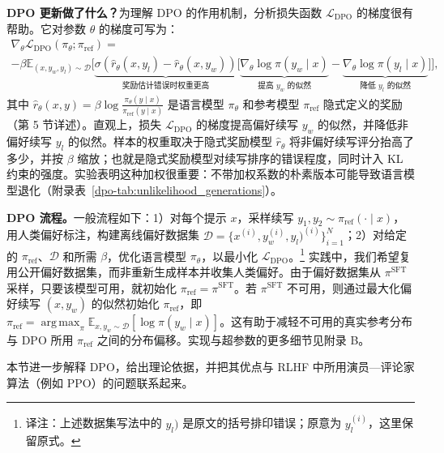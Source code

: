\textbf{DPO 更新做了什么？}为理解 DPO 的作用机制，分析损失函数 $\mathcal L_\text{DPO}$ 的梯度很有帮助。它对参数 $\theta$ 的梯度可写为：
\label{dpo-eq:gradient}
\begin{multline*}
    \nabla_\theta \mathcal{L}_\text{DPO}(\pi_\theta;\pi_{\mathrm{ref}}) = \\ -\beta\mathbb{E}_{(x, y_w, y_l) \sim \mathcal{D}} \bigg[\underbrace{\sigma(\hat{r}_\theta(x, y_l) - \hat{r}_\theta (x, y_w))}_\text{奖励估计错误时权重更高}\bigg[\underbrace{\nabla_\theta\log \pi(y_w \mid x)}_\text{提高 $y_w$ 的似然} - \underbrace{\nabla_\theta\log\pi(y_l \mid x)}_\text{降低 $y_l$ 的似然}\bigg]\bigg],
\end{multline*}
其中 $\hat r_\theta(x,y)=\beta\log\frac{\pi_\theta(y\mid x)}{\pi_{\mathrm{ref}}(y\mid x)}$ 是语言模型 $\pi_\theta$ 和参考模型 $\pi_{\mathrm{ref}}$ 隐式定义的奖励（第 5 节详述）。直观上，损失 $\mathcal L_\text{DPO}$ 的梯度提高偏好续写 $y_w$ 的似然，并降低非偏好续写 $y_l$ 的似然。样本的权重取决于隐式奖励模型 $\hat r_\theta$ 将非偏好续写评分抬高了多少，并按 $\beta$ 缩放；也就是隐式奖励模型对续写排序的错误程度，同时计入 KL 约束的强度。实验表明这种加权很重要：不带加权系数的朴素版本可能导致语言模型退化（附录表~\ref{dpo-tab:unlikelihood_generations}）。

\textbf{DPO 流程。}一般流程如下：1）对每个提示 $x$，采样续写 $y_1,y_2\sim\pi_{\mathrm{ref}}(\cdot\mid x)$，用人类偏好标注，构建离线偏好数据集 $\mathcal D=\{x^{(i)},y_w^{(i)},y_l)^{(i)}\}_{i=1}^N$；2）对给定的 $\pi_{\mathrm{ref}}$、$\mathcal D$ 和所需 $\beta$，优化语言模型 $\pi_\theta$，以最小化 $\mathcal L_\text{DPO}$。\footnote{译注：上述数据集写法中的 $y_l)$ 是原文的括号排印错误；原意为 $y_l^{(i)}$，这里保留原式。}
实践中，我们希望复用公开偏好数据集，而非重新生成样本并收集人类偏好。由于偏好数据集从 $\pi^{\mathrm{SFT}}$ 采样，只要该模型可用，就初始化 $\pi_{\mathrm{ref}}=\pi^{\mathrm{SFT}}$。若 $\pi^{\mathrm{SFT}}$ 不可用，则通过最大化偏好续写 $(x,y_w)$ 的似然初始化 $\pi_{\mathrm{ref}}$，即 ${\pi_{\mathrm{ref}}=\operatorname*{arg\,max}_\pi\mathbb E_{x,y_w\sim\mathcal D}[\log\pi(y_w\mid x)]}$。这有助于减轻不可用的真实参考分布与 DPO 所用 $\pi_{\mathrm{ref}}$ 之间的分布偏移。实现与超参数的更多细节见附录 B。



本节进一步解释 DPO，给出理论依据，并把其优点与 RLHF 中所用演员—评论家算法（例如 PPO\cite{dpo-schulman2017proximal}）的问题联系起来。

